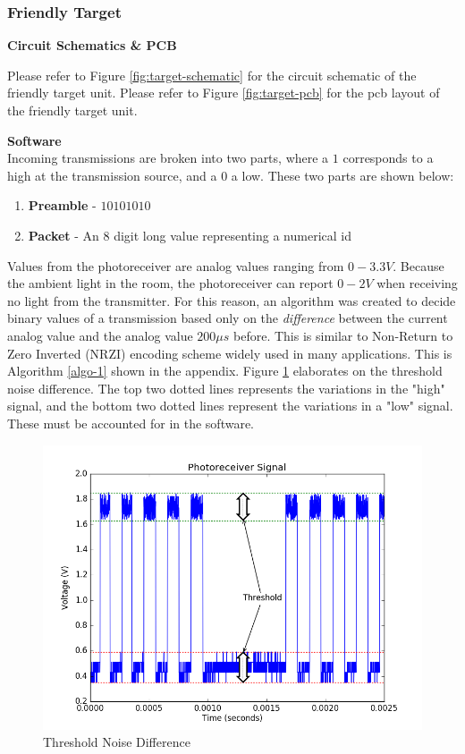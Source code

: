 \documentclass[letterpaper,10pt]{article}
\begin{document}
\begin{spacing}{1.15}
\subsubsection{Friendly Target}
\hspace{5mm}\textbf{Circuit Schematics \& PCB} \label{section:target-circuit-schematics-design-details}

Please refer to Figure \ref{fig:target-schematic} for the circuit schematic of the friendly target unit.  Please refer to Figure \ref{fig:target-pcb} for the pcb layout of the friendly target unit. 

\hspace{5mm} \textbf{Software} \label{section:target-software-design-details}\\
Incoming transmissions are broken into two parts, where a $1$ corresponds to a high at the transmission source, and a $0$ a low. These two parts are shown below:
\begin{enumerate}
	\small
	\item \textbf{Preamble} - $10101010$ 
	\item \textbf{Packet} - An 8 digit long value representing a numerical id
\end{enumerate}

Values from the photoreceiver are analog values ranging from $0-3.3V$. Because the ambient light in the room, the photoreceiver can report $0-2V$ when receiving no light from the transmitter. For this reason, an algorithm was created to decide binary values of a transmission based only on the \textit{difference} between the current analog value and the analog value $200 \mu s$ before. This is similar to Non-Return to Zero Inverted (NRZI) encoding scheme widely used in many applications. This is Algorithm \ref{algo-1} shown in the appendix.  Figure \ref{fig:threshold} elaborates on the threshold noise difference. The top two dotted lines represents the variations in the "high" signal, and the bottom two dotted lines represent the variations in a "low" signal. These must be accounted for in the software.

\begin{figure} [H]
	\centering
	\includegraphics[scale=0.45]{threshold.png}
	\caption{Threshold Noise Difference\label{fig:threshold}}
\end{figure}



\end{spacing}
\end{document}
